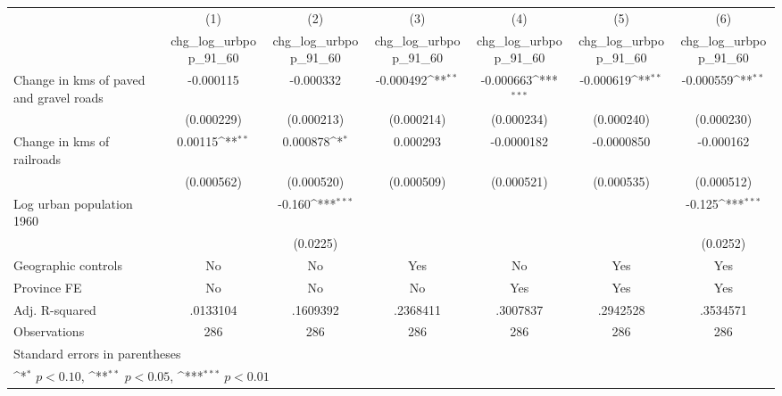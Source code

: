 {
\def\sym#1{\ifmmode^{#1}\else\(^{#1}\)\fi}
\begin{tabular}{l*{6}{c}}
\hline\hline
                    &\multicolumn{1}{c}{(1)}&\multicolumn{1}{c}{(2)}&\multicolumn{1}{c}{(3)}&\multicolumn{1}{c}{(4)}&\multicolumn{1}{c}{(5)}&\multicolumn{1}{c}{(6)}\\
                    &\multicolumn{1}{c}{chg\_log\_urbpop\_91\_60}&\multicolumn{1}{c}{chg\_log\_urbpop\_91\_60}&\multicolumn{1}{c}{chg\_log\_urbpop\_91\_60}&\multicolumn{1}{c}{chg\_log\_urbpop\_91\_60}&\multicolumn{1}{c}{chg\_log\_urbpop\_91\_60}&\multicolumn{1}{c}{chg\_log\_urbpop\_91\_60}\\
\hline
Change in kms of paved and gravel roads&   -0.000115         &   -0.000332         &   -0.000492\sym{**} &   -0.000663\sym{***}&   -0.000619\sym{**} &   -0.000559\sym{**} \\
                    &  (0.000229)         &  (0.000213)         &  (0.000214)         &  (0.000234)         &  (0.000240)         &  (0.000230)         \\
[1em]
Change in kms of railroads&     0.00115\sym{**} &    0.000878\sym{*}  &    0.000293         &  -0.0000182         &  -0.0000850         &   -0.000162         \\
                    &  (0.000562)         &  (0.000520)         &  (0.000509)         &  (0.000521)         &  (0.000535)         &  (0.000512)         \\
[1em]
Log urban population 1960&                     &      -0.160\sym{***}&                     &                     &                     &      -0.125\sym{***}\\
                    &                     &    (0.0225)         &                     &                     &                     &    (0.0252)         \\
\hline
Geographic controls &          No         &          No         &         Yes         &          No         &         Yes         &         Yes         \\
Province FE         &          No         &          No         &          No         &         Yes         &         Yes         &         Yes         \\
Adj. R-squared      &    .0133104         &    .1609392         &    .2368411         &    .3007837         &    .2942528         &    .3534571         \\
Observations        &         286         &         286         &         286         &         286         &         286         &         286         \\
\hline\hline
\multicolumn{7}{l}{\footnotesize Standard errors in parentheses}\\
\multicolumn{7}{l}{\footnotesize \sym{*} \(p<0.10\), \sym{**} \(p<0.05\), \sym{***} \(p<0.01\)}\\
\end{tabular}
}
